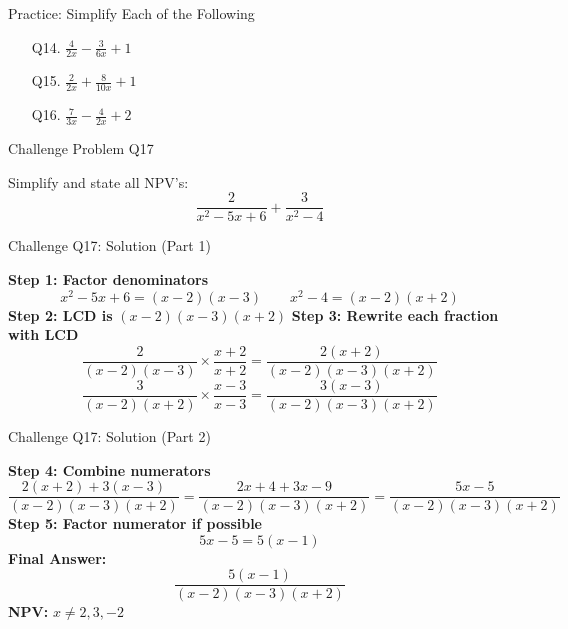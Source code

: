 \documentclass[aspectratio=169]{beamer}
\begin{document}
\begin{frame}{Practice: Simplify Each of the Following}
\begin{tcolorbox}[colback=lightgray,colframe=primary,title=Practice Problems]
\footnotesize
\begin{enumerate}
  \item[Q14.] $\frac{4}{2x} - \frac{3}{6x} + 1$
  \item[Q15.] $\frac{2}{2x} + \frac{8}{10x} + 1$
  \item[Q16.] $\frac{7}{3x} - \frac{4}{2x} + 2$
\end{enumerate}
\end{tcolorbox}
\end{frame}

\begin{frame}{Challenge Problem Q17}
\begin{tcolorbox}[colback=lightgray,colframe=primary,title=Challenge Q17]
\footnotesize
Simplify and state all NPV's:
\[
\frac{2}{x^2-5x+6} + \frac{3}{x^2-4}
\]
\end{tcolorbox}
\end{frame}

\begin{frame}{Challenge Q17: Solution (Part 1)}
\begin{tcolorbox}[colback=lightgray,colframe=accent,title=Step-by-Step Solution (Part 1)]
\footnotesize
\textbf{Step 1: Factor denominators}
\[
x^2-5x+6 = (x-2)(x-3)\qquad x^2-4 = (x-2)(x+2)
\]
\textbf{Step 2: LCD is } $(x-2)(x-3)(x+2)$
\textbf{Step 3: Rewrite each fraction with LCD}
\[
\frac{2}{(x-2)(x-3)} \times \frac{x+2}{x+2} = \frac{2(x+2)}{(x-2)(x-3)(x+2)}
\]
\[
\frac{3}{(x-2)(x+2)} \times \frac{x-3}{x-3} = \frac{3(x-3)}{(x-2)(x-3)(x+2)}
\]
\end{tcolorbox}
\end{frame}

\begin{frame}{Challenge Q17: Solution (Part 2)}
\begin{tcolorbox}[colback=lightgray,colframe=accent,title=Step-by-Step Solution (Part 2)]
\footnotesize
\textbf{Step 4: Combine numerators}
\[
\frac{2(x+2) + 3(x-3)}{(x-2)(x-3)(x+2)} = \frac{2x+4+3x-9}{(x-2)(x-3)(x+2)} = \frac{5x-5}{(x-2)(x-3)(x+2)}
\]
\textbf{Step 5: Factor numerator if possible}
\[
5x-5 = 5(x-1)
\]
\textbf{Final Answer:}
\[
\frac{5(x-1)}{(x-2)(x-3)(x+2)}
\]
\textbf{NPV:} $x \neq 2, 3, -2$
\end{tcolorbox}
\end{frame}
\end{document}
